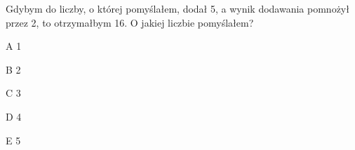 \begin{tresc}
Gdybym do liczby, o której pomyślałem, dodał 5, a wynik dodawania pomnożył przez 2, to otrzymałbym 16. O jakiej liczbie pomyślałem?
\end{tresc}
\begin{wariant}{A} 1 \end{wariant}
\begin{wariant}{B} 2 \end{wariant}
\begin{wariant}{C} 3 \end{wariant}
\begin{wariant}{D} 4 \end{wariant}
\begin{wariant}{E} 5 \end{wariant}
